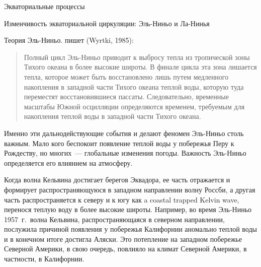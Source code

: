 \begin{chapter}{Экваториальные процессы}
\begin{section}{Изменчивость экваториальной циркуляции: Эль-Ниньо и Ла-Нинья}
\begin{paragraph}{Теория Эль-Ниньо.}
пишет (Wyrtki, 1985):
%
%
\begin{quote}
Полный цикл Эль-Ниньо приводит к выбросу тепла из тропической зоны Тихого 
океана в более высокие широты. В финале цикла эта зона лишается тепла,
которое может быть восстановлено лишь путем медленного накопления в западной 
части Тихого океана теплой воды, которую туда переместят восстановившиеся 
пассаты. Следовательно, временные масштабы Южной осцилляции определяются 
временем, требуемым для накопления теплой воды в западной части Тихого океана.
%
\end{quote}

Именно эти дальнодействующие события и делают феномен Эль-Ниньо столь важным.
Мало кого беспокоит появление теплой воды у побережья Перу к Рождеству,
но многих~--- глобальные изменения погоды. Важность Эль-Ниньо определяется
его влиянием на атмосферу.
%

Когда волна Кельвина достигает берегов Эквадора,
ее часть отражается и формирует распространяющуюся в западном направлении
волну Россби, а другая часть распространяется к северу
и к югу как a coastal trapped Kelvin wave, перенося теплую воду в более 
высокие широты. Например, во время Эль-Ниньо 1957~г.\ волна Кельвина,
распространяющаяся в северном направлении, послужила причиной появления
у побережья Калифорнии аномально теплой воды и в конечном итоге достигла 
Аляски.
Это потепление на западном побережье Северной Америки, в свою очередь,
повлияло на климат Северной Америки, в частности, в Калифорнии.
%


\end{paragraph}
\end{section}
\end{chapter}
